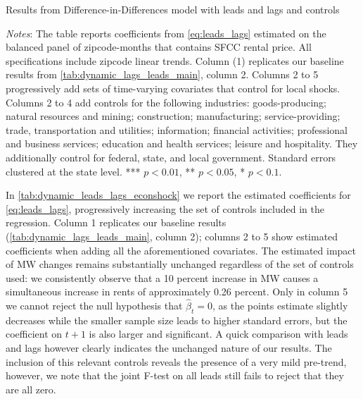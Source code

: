 \begin{table}[h!]
    \caption{Results from Difference-in-Differences model with leads and lags and controls}
    \label{tab:dynamic_leads_lags_econshock}
    \centering
    \resizebox{0.9\textwidth}{!}{
	    \vspace{0pt}
	    }
    \begin{minipage}{0.95\textwidth} \footnotesize
		\vspace{3mm} 
		\textit{Notes}: The table reports coefficients from \autoref{eq:leads_lags} estimated on the 
		balanced panel of zipcode-months that contains SFCC rental price. All specifications include 
		zipcode linear trends. Column (1) replicates our baseline results from 
		\autoref{tab:dynamic_lags_leads_main}, column 2. Columns 2 to 5 progressively add sets of 
		time-varying covariates that control for local shocks. Columns 2 to 4 add controls for the 
		following industries: goods-producing; natural resources and mining; construction; 
		manufacturing; service-providing; trade, transportation and utilities; information; 
		financial activities; professional and business services; education and health services; 
		leisure and hospitality. They additionally control for federal, state, and local government. 
		Standard errors clustered at the state level. *** $p < 0.01$, ** $p < 0.05$, * $p < 0.1$.
	\end{minipage}
\end{table}

In \autoref{tab:dynamic_leads_lags_econshock} we report the estimated coefficients for 
\autoref{eq:leads_lags}, progressively increasing the set of controls included in the regression. 
Column 1 replicates our baseline results (\autoref{tab:dynamic_lags_leads_main}, column 2); columns 
2 to 5 show estimated coefficients when adding all the aforementioned covariates. The estimated 
impact of MW changes remains substantially unchanged regardless of the set of controls used: we 
consistently observe that a 10 percent increase in MW causes a simultaneous increase in rents of 
approximately 0.26 percent. Only in column 5 we cannot reject the null hypothesis that 
$\hat{\beta}_{t} = 0$, as the points estimate slightly decreases while the smaller sample size leads 
to higher standard errors, but the coefficient on $t+1$ is also larger and significant. A quick 
comparison with leads and lags however clearly indicates the unchanged nature of our results. The 
inclusion of this relevant controls reveals the presence of a very mild pre-trend, however, we note 
that the joint F-test on all leads still fails to reject that they are all zero.   



